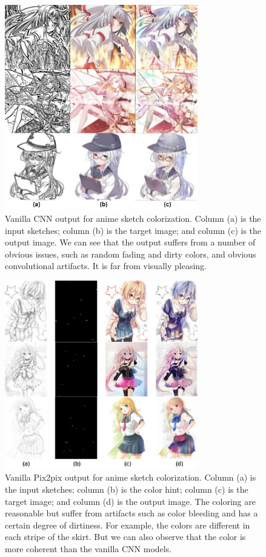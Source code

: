 \begin{figure}
    \centering
    \includegraphics[width=0.75\textwidth]{images/colorization/cnn.jpg}
    \caption{Vanilla CNN output for anime sketch colorization. Column (a) is the input sketches; column (b) is the target image; and column (c) is the output image.\cite{fransOutlineColorizationTandem2017} We can see that the output suffers from a number of obvious issues, such as random fading and dirty colors, and obvious convolutional artifacts. It is far from visually pleasing.} 
    \label{fig:colorization_cnn}
\end{figure}


\begin{figure}
    \centering
    \includegraphics[width=0.75\textwidth]{images/colorization/pix2pix.jpg}
    \caption{Vanilla Pix2pix output for anime sketch colorization. Column (a) is the input sketches; column (b) is the color hint; column (c) is the target image; and column (d) is the output image.\cite{steinsDeepLearningProject2022} The coloring are reasonable but suffer from artifacts such as color bleeding and has a certain degree of dirtiness. For example, the colors are different in each stripe of the skirt. But we can also observe that the color is more coherent than the vanilla CNN models.} 
    \label{fig:colorization_pix2pix}
\end{figure}


